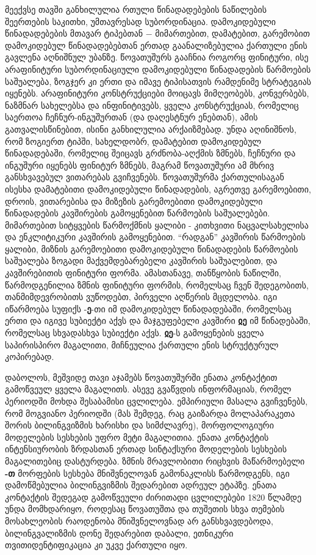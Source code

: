 \begin{otherlanguage}{georgian}
	მეექვსე თავში განხილულია რთული წინადადებების ნაწილების შეერთების საკითხი, უმთავრესად სუბორდინაცია. დამოკიდებული წინადადებების მთავარ ტიპებთან − მიმართებით, დამატებით, გარემობით დამოკიდებულ წინადადებებთან ერთად გაანალიზებულია ქართული ენის გავლენა აღნიშნულ უბანზე. წოვათუშურს გააჩნია როგორც ფინიტური, ისე არაფინიტური სუბორდინაციული დამოკიდებული წინადადების წარმოების საშუალება, ზოგჯერ კი ერთი და იმავე ტიპისათვის რამდენიმე სტრატეგიას იყენებს. არაფინიტური კონსტრუქციები მოიცავს მიმღეობებს, კონვერბებს, ნაზმნარ სახელებსა და ინფინიტივებს, ყველა კონსტრუქციას, რომელიც საერთოა ჩეჩნურ-ინგუშურთან (და დაღესტნურ ენებთან), ამის გათვალისწინებით, ისინი განხილულია არქაიზმებად. უნდა აღინიშნოს, რომ ზოგიერთ ტიპში, სახელდობრ, დამატებით დამოკიდებულ წინადადებაში, რომელიც შეიცავს გრძნობა-აღქმის ზმნებს, ჩეჩნური და ინგუშური იყენებს ფინიტურ ზმნებს, მაგრამ წოვათუშური ამ მხრივ განსხვავებულ ვითარებას გვიჩვენებს. წოვათუშურმა ქართულისაგან ისესხა დამატებითი დამოკიდებული წინადადების, აგრეთვე გარემოებითი, დროის, ვითარებისა და მიზეზის გარემოებითი დამოკიდებული წინადადების კავშირების გამოყენებით წარმოების საშუალებები.  მიმართებით სიტყვების წარმოქმნის ყალიბი - კითხვითი ნაცვალსახელისა და ენკლიტიკური კავშირის გამოყენებით. “რადგან” კავშირის  წარმოების ყალიბი, მიზნის გარემოებითი დამოკიდებული წინადადების წარმოების საშუალება ზოგადი მაქვემდებარებელი კავშირის საშუალებით, და კავშირებითის ფინიტური ფორმა. ამასთანავე, თანწყობის ნაწილში, წარმოდგენილია  ზმნის ფინიტური ფორმის, რომელსაც ჩვენ შედეგობითს, თანმიმდევრობითს ვუწოდებთ, პირველი აღწერის მცდელობა. იგი იწარმოება სუფიქს -\textbf{ე}-თი იმ დამოკიდებულ წინადადებაში, რომელსაც ერთი და იგივე სუბიექტი აქვს და მაჯგუფებელი კავშირი \textbf{ჲე} იმ წინადებაში, რომელსაც სხვადასხვა სუბიექტი აქვს. \textbf{ჲე}-ს გამოყენების ყველა საპირისპირო მაგალითი, მიჩნეულია ქართული ენის სტრუქტურულ კოპირებად.


	დაბოლოს, მეშვიდე თავი აჯამებს წოვათუშურში ენათა კონტაქტით  გამოწვეულ ყველა მაგალითს. ასევე გვაწვდის ინფორმაციას, რომელ პერიოდში მოხდა შესაბამისი ცვლილება. ემპირიული მასალა გვიჩვენებს, რომ მოგვიანო პერიოდში (მას შემდეგ, რაც გაიზარდა მოლაპარაკეთა შორის ბილინგვიზმის ხარისხი და სიმძლავრე), მორფოლოგიური მოდელების სესხების უფრო მეტი მაგალითია. ენათა კონტაქტის ინტენსიურობის ზრდასთან ერთად სინტაქსური მოდელების სესხების მაგალითებიც დასტურდება. ზმნის მრავლობითი რიცხვის მაწარმოებელი \textbf{-თ} მორფების სესხება მნიშვნელოვან გამონაკლისს წარმოდგენს, იგი დამოწმებულია ბილინგვიზმის შედარებით ადრეულ ეტაპზე. ენათა კონტაქტის შედეგად გამოწვეული ძირითადი ცვლილებები 1820 წლამდე უნდა მომხდარიყო, როდესაც წოვათუშთა და თუშეთის სხვა თემების მოსახლეობის რაოდენობა მნიშვნელოვნად არ განსხვავდებოდა, ბილინგვალიზმის დონე შედარებით დაბალი, ეთნიკური თვითიდენტიფიკაცია კი უკვე ქართული იყო.
\end{otherlanguage}
